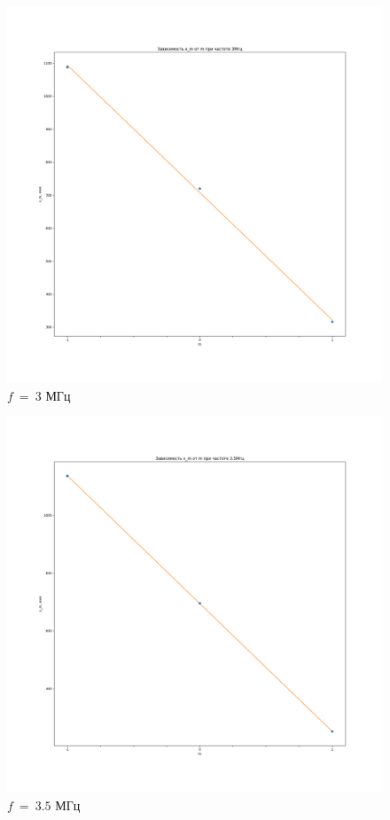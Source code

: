 \documentclass[a4paper, 12pt]{article}
\begin{document}
    \begin{figure}[!h]
        \centering
        \includegraphics[scale = 0.4]{graph3.png}
        \caption{$f~=~3$ МГц}
        \label{g3}
    \end{figure}

    \begin{figure}[!h]
        \centering
        \includegraphics[scale = 0.4]{graph4.png}
        \caption{$f~=~3.5$ МГц}
        \label{g4}
    \end{figure}
\end{document}

